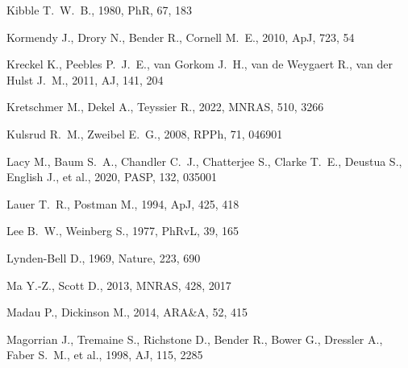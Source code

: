 \documentclass[fleqn,12pt]{article}
\begin{document}
\begin{thebibliography}{}
 Kibble T.~W.~B., 1980, PhR, 67, 183

 Kormendy J., Drory N., Bender R., Cornell M.~E., 2010, ApJ, 723, 54



 Kreckel K., Peebles P.~J.~E., van Gorkom J.~H., van de Weygaert R., van der Hulst J.~M., 2011, AJ, 141, 204

 Kretschmer M., Dekel A., Teyssier R., 2022, MNRAS, 510, 3266


 Kulsrud R.~M., Zweibel E.~G., 2008, RPPh, 71, 046901

 Lacy M., Baum S.~A., Chandler C.~J., Chatterjee S., Clarke T.~E., Deustua S., English J., et al., 2020, PASP, 132, 035001

 Lauer T.~R., Postman M., 1994, ApJ, 425, 418

 Lee B.~W., Weinberg S., 1977, PhRvL, 39, 165

 Lynden-Bell D., 1969, Nature, 223, 690

 Ma Y.-Z., Scott D., 2013, MNRAS, 428, 2017

 Madau P., Dickinson M., 2014, ARA\&A, 52, 415

 Magorrian J., Tremaine S., Richstone D., Bender R., Bower G., Dressler A., Faber S.~M., et al., 1998, AJ, 115, 2285


\end{thebibliography}
\end{document}
